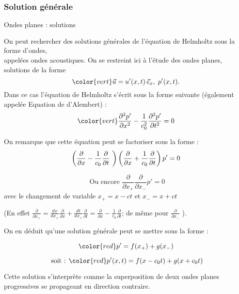 \subsubsection{Solution générale}
\begin{frame}{Ondes planes : solutions}

\small
On peut rechercher des solutions générales de l'équation de Helmholtz sous la forme d'ondes, \\
appelées ondes acoustiques.
On se restreint ici à l'étude des ondes \textcolor{vert}{planes}, solutions de la forme
\[ \color{vert}
	\myvec{u} = u'(x, t) \, \vec{e}_x, \; p'(x, t).
\]
Dans ce cas l'équation de Helmholtz s'écrit sous la forme suivante (également appelée Equation de d'Alembert) :
\begin{equation}
	\color{vert}
		 \ddpdx{ p'} - \frac{1}{c_0^2} \ddpdt{p'} = 0 
\end{equation}
\pause


On remarque que cette équation peut se factoriser sous la forme :
\[
	\left (\dpdx{} - \frac{1}{c_0} \dpdt{} \ \right ) \left (\dpdx{} + \frac{1}{c_0} \dpdt{} \right) p'
=
	0
\]
\pause


\[
\mbox{ Ou encore }
 \frac{\partial }{\partial x_+} \frac{\partial }{\partial x_-} p' = 0
 \]
 avec le changement de variable $ x_+ = x-ct \mbox{ et } x_- = x+ct$ 

\medskip


\textcolor{gris}{\small (En effet 
$\frac{\partial}{\partial x_+} = \frac{dx}{dx_+} \frac{\partial}{\partial x} + \frac{dt}{dx_+} 
\frac{\partial}{\partial t}  = 
\frac{\partial}{\partial x} - \frac{1}{c_0} \frac{\partial}{\partial t}$; de même pour $ \frac{\partial}{\partial x_-}$ ).}

\smallskip
On en déduit qu'une solution générale peut se mettre sous la forme :


\[ \color{red}
	p' =   f(x_+) + g(x_-)
\]

\[ \mbox{ soit : } \color{red} 
	p'(x, t) =   f(x-c_0 t) + g(x+c_0 t)
\]

Cette solution s'interprète comme la superposition de deux {\color{red} ondes planes progressives} se propageant en direction contraire.






\vspace{0mm}



\end{frame}


